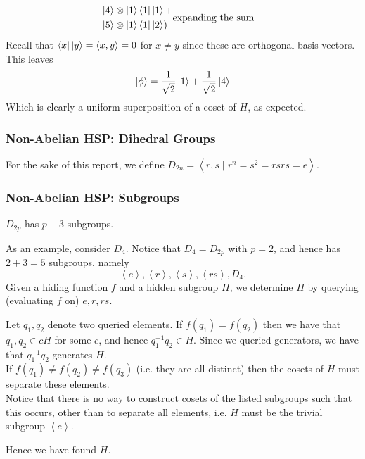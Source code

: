 \documentclass{beamer}
\renewcommand{\bra}{\Bra}
\renewcommand{\ket}{\Ket}
\renewcommand{\bra}{\Bra}
\renewcommand{\ket}{\Ket}
\newcommand{\inner}[2]{\left\langle #1, #2 \right\rangle}
\newcommand{\gen}[1]{\left\langle #1 \right\rangle}
\begin{document}
\begin{frame}
\begin{example}
\begin{align*}
\begin{aligned}
                    &\ket{4} \otimes \ket{1}\bra{1}\ket{1} + \\
                    &\ket{5} \otimes \ket{1}\bra{1}\ket{2}
                    )
                    \end{aligned} & \text{expanding the sum}
                \end{align*}
                Recall that $\bra{x}\ket{y} = \inner{x}{y} = 0$ for $x \neq y$ since these are orthogonal basis vectors. This leaves
                $$ \ket{\phi} = \frac{1}{\sqrt{2}} \ket{1} + \frac{1}{\sqrt{2}} \ket{4}$$
            Which is clearly a uniform superposition of a coset of $H$, as expected.
        \end{example}
\end{frame}

\begin{frame}
\frametitle{Non-Abelian HSP: Dihedral Groups}\label{sec:non_abelian_HSP}
        For the sake of this report, we define $D_{2n} = \gen{r, s \mid r^n = s^2 = rsrs = e}$.
\end{frame}

\begin{frame}
\frametitle{Non-Abelian HSP: Subgroups}
        \begin{theorem}
            $D_{2p}$ has $p + 3$ subgroups.
        \end{theorem}
        \begin{example}
            As an example, consider $D_4$.
            Notice that $D_4 = D_{2p}$ with $p = 2$, and hence has $2 + 3 = 5$ subgroups, namely
                $$\gen{e}, \gen{r}, \gen{s}, \gen{rs}, D_4.$$
            Given a hiding function $f$ and a hidden subgroup $H$, we determine $H$ by querying (evaluating $f$ on) $e, r, rs$.
            
            Let $q_1, q_2$ denote two queried elements.
            If $f(q_1) = f(q_2)$ then we have that $q_1, q_2 \in cH$ for some $c$, and hence $q_1^{-1} q_2 \in H$.
            Since we queried generators, we have that $q_1^{-1} q_2$ generates $H$.\\
            If $f(q_1) \neq f(q_2) \neq f(q_3)$ (i.e. they are all distinct) then the cosets of $H$ must separate these elements.\\
            Notice that there is no way to construct cosets of the listed subgroups such that this occurs, other than to separate all elements, i.e. $H$ must be the trivial subgroup $\gen{e}$.

            Hence we have found $H$.
        \end{example}
\end{frame}
\end{document}
